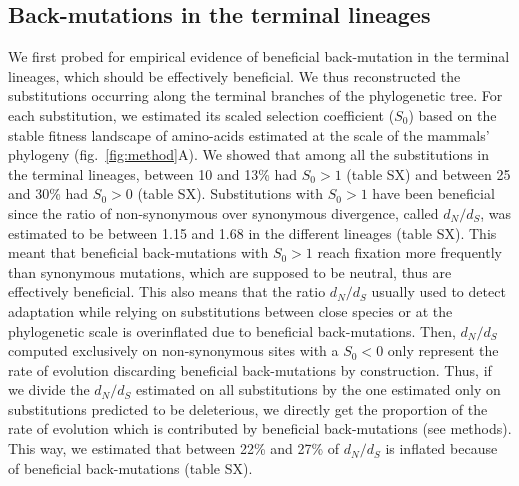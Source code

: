 \documentclass{article}
\newcommand{\dn}{d_N}
\newcommand{\ds}{d_S}
\newcommand{\dnds}{\dn / \ds}
\newcommand{\Sphy}{S_{0}}
\begin{document}
    \subsection*{Back-mutations in the terminal lineages}
    We first probed for empirical evidence of beneficial back-mutation in the terminal lineages, which should be effectively beneficial.
    We thus reconstructed the substitutions occurring along the terminal branches of the phylogenetic tree.
    For each substitution, we estimated its scaled selection coefficient ($\Sphy$) based on the stable fitness landscape of amino-acids estimated at the scale of the mammals' phylogeny (fig.~\ref{fig:method}A).
    We showed that among all the substitutions in the terminal lineages, between 10 and 13\% had $\Sphy > 1$ (table SX) and between 25 and 30\% had $\Sphy > 0$ (table SX).
    Substitutions with $\Sphy > 1$ have been beneficial since the ratio of non-synonymous over synonymous divergence, called $\dnds$, was estimated to be between 1.15 and 1.68 in the different lineages (table SX).
    This meant that beneficial back-mutations with $\Sphy > 1$ reach fixation more frequently than synonymous mutations, which are supposed to be neutral, thus are effectively beneficial.
    This also means that the ratio $\dnds$ usually used to detect adaptation while relying on substitutions between close species\cite{mcdonald_adaptative_1991, galtier_adaptive_2016} or at the phylogenetic scale\cite{goldman_codonbased_1994, yang_codonsubstitution_2002} is overinflated due to beneficial back-mutations.
    Then, $\dnds$ computed exclusively on non-synonymous sites with a $\Sphy < 0$ only represent the rate of evolution discarding beneficial back-mutations by construction.
    Thus, if we divide the $\dnds$ estimated on all substitutions by the one estimated only on substitutions predicted to be deleterious, we directly get the proportion of the rate of evolution which is contributed by beneficial back-mutations (see methods).
    This way, we estimated that between 22\% and 27\% of $\dnds$ is inflated because of beneficial back-mutations (table SX).
\end{document}
